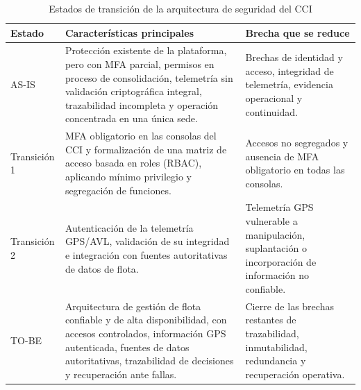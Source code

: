 \begin{table}[H]
	\centering
	\caption{Estados de transición de la arquitectura de seguridad del CCI}
	\label{tab:estados_transicion}
	\small
	\setlength{\tabcolsep}{4pt}
	\renewcommand{\arraystretch}{1.2}

	\begin{tabularx}{\textwidth}{
			>{\raggedright\arraybackslash}p{2.2cm}
			>{\raggedright\arraybackslash}X
			>{\raggedright\arraybackslash}X}

		\toprule
		\textbf{Estado}                                                          &
		\textbf{Características principales}                                     &
		\textbf{Brecha que se reduce}                                              \\
		\midrule

		AS-IS                                                                    &
		Protección existente de la plataforma, pero con MFA parcial, permisos en proceso de
		consolidación, telemetría sin validación criptográfica integral, trazabilidad incompleta y
		operación concentrada en una única sede.                                 &
		Brechas de identidad y acceso, integridad de telemetría, evidencia operacional y
		continuidad.                                                               \\

		\addlinespace

		Transición 1                                                             &
		MFA obligatorio en las consolas del CCI y formalización de una matriz de acceso basada
		en roles (RBAC), aplicando mínimo privilegio y segregación de funciones. &
		Accesos no segregados y ausencia de MFA obligatorio en todas las consolas. \\

		\addlinespace

		Transición 2                                                             &
		Autenticación de la telemetría GPS/AVL, validación de su integridad e integración con
		fuentes autoritativas de datos de flota.                                 &
		Telemetría GPS vulnerable a manipulación, suplantación o incorporación de información
		no confiable.                                                              \\

		\addlinespace

		TO-BE                                                                    &
		Arquitectura de gestión de flota confiable y de alta disponibilidad, con accesos
		controlados, información GPS autenticada, fuentes de datos autoritativas, trazabilidad
		de decisiones y recuperación ante fallas.                                &
		Cierre de las brechas restantes de trazabilidad, inmutabilidad, redundancia y
		recuperación operativa.                                                    \\


\end{tabularx}
\end{table}
